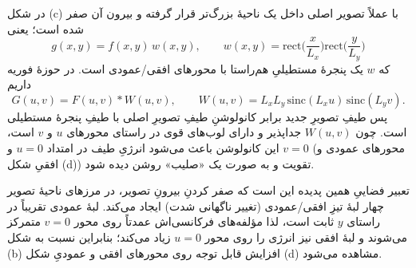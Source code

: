 در شکل (c) با  عملاً تصویر اصلی داخل یک ناحیهٔ بزرگ‌تر قرار گرفته و بیرون آن صفر شده است؛ یعنی
$$
g(x,y)=f(x,y)\,w(x,y),
\qquad
w(x,y)=\mathrm{rect}\!\Big(\frac{x}{L_x}\Big)\mathrm{rect}\!\Big(\frac{y}{L_y}\Big)
$$
که $w$ یک پنجرهٔ مستطیلیِ هم‌راستا با محورهای افقی/عمودی است. در حوزهٔ فوریه داریم
$$
G(u,v)=F(u,v)\ast W(u,v),
\qquad
W(u,v)=L_xL_y\,\mathrm{sinc}(L_xu)\,\mathrm{sinc}(L_yv).
$$
پس طیفِ تصویرِ جدید برابر کانولوشنِ طیفِ تصویرِ اصلی با طیفِ پنجرهٔ مستطیلی است. چون $W(u,v)$ جداپذیر و دارای لوب‌های قوی در راستای محورهای $u$ و $v$ است، این کانولوشن باعث می‌شود انرژیِ طیف در امتداد $u=0$ و $v=0$ (محورهای عمودی و افقیِ شکل (d)) تقویت و به صورت یک «صلیب» روشن دیده شود.

تعبیر فضاییِ همین پدیده این است که صفر کردنِ بیرونِ تصویر، در مرزهای ناحیهٔ تصویر چهار لبهٔ تیزِ افقی/عمودی (تغییر ناگهانی شدت) ایجاد می‌کند. لبهٔ عمودی تقریباً در راستای $y$ ثابت است، لذا مؤلفه‌های فرکانسی‌اش عمدتاً روی محور $v=0$ متمرکز می‌شوند و لبهٔ افقی نیز انرژی را روی محور $u=0$ زیاد می‌کند؛ بنابراین نسبت به شکل (b) افزایش قابل توجه روی محورهای افقی و عمودیِ شکل (d) مشاهده می‌شود.